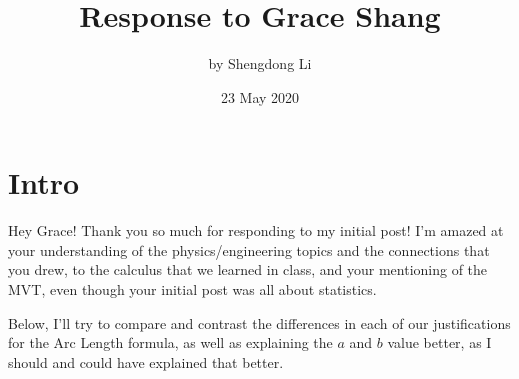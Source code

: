 \documentclass[letterpaper, 12pt]{article}
\begin{document}
\title{Response to Grace Shang}
\author{by Shengdong Li}
\date{23 May 2020}
\maketitle

\section{Intro}
Hey Grace! Thank you so much for responding to my initial post! I'm amazed at your understanding of the physics/engineering topics and the connections that you drew, to the calculus that we learned in class, and your mentioning of the MVT, even though your initial post was all about statistics. \par
Below, I'll try to compare and contrast the differences in each of our justifications for the Arc Length formula, as well as explaining the $a$ and $b$ value better, as I should and could have explained that better.
\end{document}
